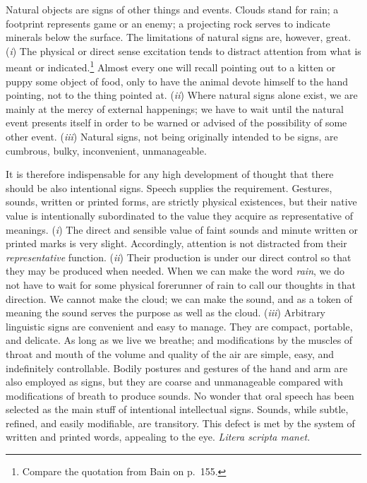 \documentclass[letterpaper]{book}
\begin{document}

Natural objects are signs of other things and events. Clouds stand for
rain; a footprint represents game or an enemy; a projecting rock serves
to indicate minerals below the surface. The limitations of natural signs
are, however, great. (\emph{i}) The physical or direct sense excitation
tends to distract attention from what is meant or
indicated.\footnote{ Compare the quotation from Bain on p.\ 155. }
Almost every one will recall pointing out to a kitten or puppy some
object of food, only to have the animal devote himself to the hand
pointing, not to the thing pointed at. (\emph{ii}) Where natural signs
alone exist, we are mainly at the mercy of external happenings;
we
have to wait until the natural event presents itself in order to be
warned or advised of the possibility of some other event. (\emph{iii})
Natural signs, not being originally intended to be signs, are cumbrous,
bulky, inconvenient, unmanageable.


It is therefore indispensable for any high development of thought that
there should be also intentional signs. Speech supplies the requirement.
Gestures, sounds, written or printed forms, are strictly physical
existences, but their native value is intentionally subordinated to the
value they acquire as representative of meanings. (\emph{i}) The direct
and sensible value of faint sounds and minute written or printed marks
is very slight. Accordingly, attention is not distracted from their
\emph{representative} function. (\emph{ii}) Their production is under
our direct control so that they may be produced when needed. When we can
make the word \emph{rain}, we do not have to wait for some physical
forerunner of rain to call our thoughts in that direction. We cannot
make the cloud; we can make the sound, and as a token of meaning the
sound serves the purpose as well as the cloud. (\emph{iii}) Arbitrary
linguistic signs are convenient and easy to manage. They are compact,
portable, and delicate. As long as we live we breathe; and modifications
by the muscles of throat and mouth of the volume and quality of the air
are simple, easy, and indefinitely controllable. Bodily postures and
gestures of the hand and arm are also employed as signs, but they are
coarse and unmanageable compared with modifications of breath to produce
sounds. No wonder that oral speech has been selected as the main stuff
of intentional intellectual signs. Sounds, while subtle, refined, and
easily modifiable, are transitory. This defect is met by the system of
written
and printed words, appealing to the eye. \emph{Litera scripta manet.}
\end{document}
